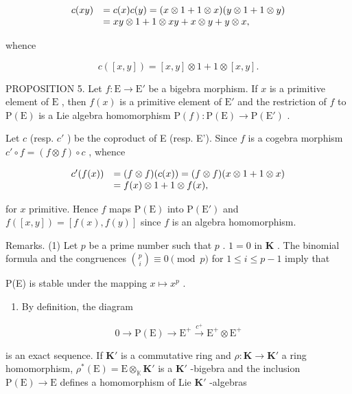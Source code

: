 \[
\begin{array}{r l} c (x y) & = c (x) c (y) = (x \otimes 1 + 1 \otimes x) (y \otimes 1 + 1 \otimes y) \\ & = x y \otimes 1 + 1 \otimes x y + x \otimes y + y \otimes x, \end{array}
\]

whence

\[
c ([ x, y ]) = [ x, y ] \otimes 1 + 1 \otimes [ x, y ].
\]

PROPOSITION 5. Let \(f: \mathrm{E} \to \mathrm{E}'\) be a bigebra morphism. If \(x\) is a primitive element of \(\mathrm{E}\) , then \(f(x)\) is a primitive element of \(\mathrm{E}'\) and the restriction of \(f\) to \(\mathrm{P(E)}\) is a Lie algebra homomorphism \(\mathrm{P}(f): \mathrm{P(E)} \to \mathrm{P(E')}\) .

Let \(c\) (resp. \(c'\) ) be the coproduct of E (resp. E'). Since \(f\) is a cogebra morphism \(c' \circ f = (f \otimes f) \circ c\) , whence

\[
\begin{array}{r l} c ^ {\prime} (f (x)) & = (f \otimes f) (c (x)) = (f \otimes f) (x \otimes 1 + 1 \otimes x) \\ & = f (x) \otimes 1 + 1 \otimes f (x), \end{array}
\]

for \(x\) primitive. Hence \(f\) maps \(\mathrm{P(E)}\) into \(\mathrm{P(E')}\) and \(f([x,y]) = [f(x),f(y)]\) since \(f\) is an algebra homomorphism.

Remarks. (1) Let \(p\) be a prime number such that \(p\) . \(1 = 0\) in \(\mathbf{K}\) . The binomial formula and the congruences \(\binom{p}{i} \equiv 0 \pmod{p}\) for \(1 \leqslant i \leqslant p - 1\) imply that

P(E) is stable under the mapping \(x \mapsto x^p\) .

\begin{enumerate}
\def\labelenumi{(\arabic{enumi})}
\setcounter{enumi}{1}
\tightlist
\item
  By definition, the diagram
\end{enumerate}

\[
0 \longrightarrow \mathrm{P(E)} \longrightarrow \mathrm {E^ {+}} \stackrel {c ^ {+}} {\longrightarrow} \mathrm {E^ {+}} \otimes \mathrm {E^ {+}}
\]

is an exact sequence. If \(\mathbf{K}'\) is a commutative ring and \(\rho: \mathbf{K} \to \mathbf{K}'\) a ring homomorphism, \(\rho^*(\mathrm{E}) = \mathrm{E} \otimes_{\mathbb{K}} \mathbf{K}'\) is a \(\mathbf{K}'\) -bigebra and the inclusion \(\mathrm{P}(\mathrm{E}) \to \mathrm{E}\) defines a homomorphism of Lie \(\mathbf{K}'\) -algebras

